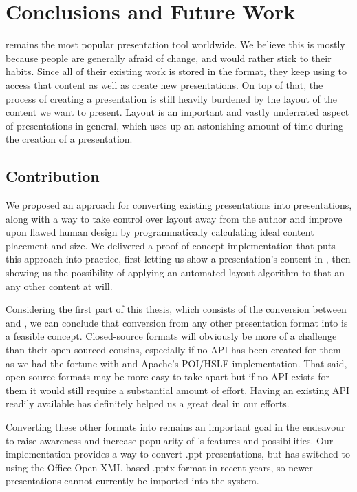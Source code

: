 
 \chapter{Conclusions and Future Work}

  \ppt* remains the most popular presentation tool worldwide. We believe this
  is mostly because people are generally afraid of change, and would rather
  stick to their habits. Since all of their existing work is stored in the \ppt
  format, they keep using \ppt to access that content as well as create new
  presentations. On top of that, the process of creating a presentation is
  still heavily burdened by the layout of the content we want to present.
  Layout is an important and vastly underrated aspect of presentations in
  general, which uses up an astonishing amount of time during the creation of a
  presentation.

  \section{Contribution}

   We proposed an approach for converting existing \ppt presentations into \mxp
   presentations, along with a way to take control over layout away from the
   author and improve upon flawed human design by programmatically calculating
   ideal content placement and size. We delivered a proof of concept
   implementation that puts this approach into practice, first letting us show
   a \ppt presentation's content in \mxp, then showing us the possibility of
   applying an automated layout algorithm to that an any other \mxp content at
   will.

   Considering the first part of this thesis, which consists of the conversion
   between \ppt and \mxp, we can conclude that conversion from any other
   presentation format into \mxp is a feasible concept. Closed-source formats
   will obviously be more of a challenge than their open-sourced cousins,
   especially if no API has been created for them as we had the fortune with
   \ppt and Apache's POI/HSLF implementation. That said, open-source formats
   may be more easy to take apart but if no API exists for them it would still
   require a substantial amount of effort. Having an existing API readily
   available has definitely helped us a great deal in our efforts.

   Converting these other formats into \mxp remains an important goal in the
   endeavour to raise awareness and increase popularity of \mxp's features and
   possibilities. Our implementation provides a way to convert \ppt .ppt
   presentations, but \ppt* has switched to using the Office Open XML-based
   .pptx format in recent years, so newer \ppt presentations cannot currently
   be imported into the \mxp system.

